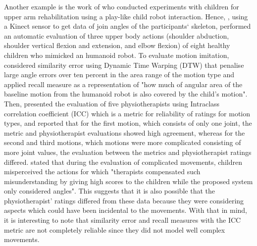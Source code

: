 Another example is the work of \cite{guneysu2014} who conducted experiments 
with children for upper 
arm rehabilitation using a play-like child robot interaction.
Hence, \cite{guneysu2014}, using a Kinect sensor to get data of join angles of 
the participants` skeleton, performed an automatic evaluation of three 
upper body actions (shoulder abduction, shoulder vertical flexion and 
extension, and elbow flexion) of eight healthy children who mimicked an 
humanoid robot. To evaluate motion imitation, \citealt[p. 202]{guneysu2014} 
considered similarity error using Dynamic Time Warping (DTW) that 
penalise large angle errors over ten percent in the area range of the 
motion type and applied recall measure as a representation of 
"how much of angular area of the baseline motion
from the humanoid robot is also covered by the child's motion".
Then, \cite{guneysu2014} presented the evaluation of five physiotherapists 
using Intraclass correlation coefficient (ICC) which is a metric for 
reliability of ratings for motion types, and reported that for the 
first motion, which consists of only one joint, the metric and 
physiotherapist evaluations showed high agreement, whereas for the 
second and third motions, which motions were more complicated 
consisting of more joint values, the evaluation between the metrics 
and physiotherapist ratings differed.
\citealt[p. 203]{guneysu2014} stated that during the evaluation of complicated 
movements, children misperceived the actions for which "therapists
compensated such misunderstanding by giving high scores to the children
while the proposed system only considered angles".
This suggests that it is also possible that the physiotherapist' ratings 
differed from these data because they were considering aspects 
which could have been incidental to the movements.
With that in mind, it is interesting to note that 
similarity error and recall measures with the ICC metric are not 
completely reliable since 
they did not model well complex movements.

